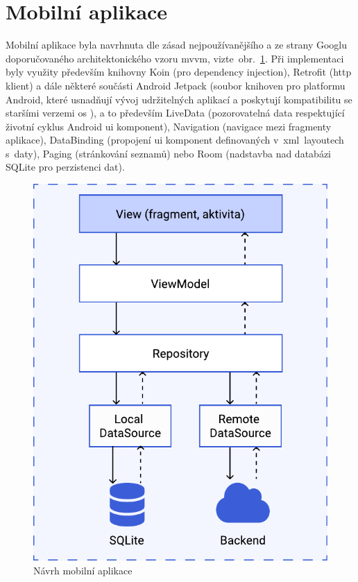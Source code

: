 \documentclass[a4paper,11pt,openany,twoside]{book}
\begin{document}
\section{Mobilní aplikace}

Mobilní aplikace byla navrhnuta dle zásad nejpoužívanějšího a ze strany Googlu doporučovaného architektonického vzoru \acs{mvvm}, vizte~obr.~\ref{fig:mobile-app}. Při implementaci byly využity především knihovny Koin (pro dependency injection), Retrofit (\acs{http} klient) a dále některé součásti Android Jetpack (soubor knihoven pro platformu Android, které usnadňují vývoj udržitelných aplikací a poskytují kompatibilitu se staršími verzemi \acs{os} \cite{android2020jetpack}), a to především LiveData (pozorovatelná data respektující životní cyklus Android \acs{ui} komponent), Navigation (navigace mezi fragmenty aplikace), DataBinding (propojení \acs{ui} komponent definovaných v~\acs{xml}~layoutech s~daty), Paging (stránkování seznamů) nebo Room (nadstavba nad databázi SQLite pro perzistenci dat).

\begin{figure}[h]
	\centering
	\includegraphics[scale=0.7]{img/mobile-app.pdf}
	\caption{Návrh mobilní aplikace}
	\label{fig:mobile-app}
\end{figure}
\end{document}
